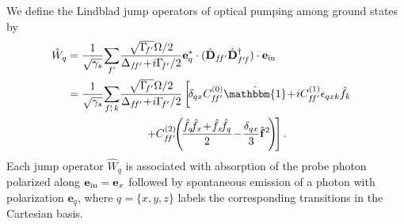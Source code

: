 \documentclass[aps,pra,twocolumn,superscriptaddress]{revtex4-1} %
\def\bra#1{\langle{#1}\rvert}%
\def\ket#1{\lvert{#1}\rangle}%
\def\Braket#1#2{\mathinner{\langle{#1}\! \mid\! {#2} \rangle}}
\newcommand{\nn}{\nonumber}
\begin{document}
\begin{appendix}
We define the Lindblad jump operators of optical pumping among ground states by~\cite{Deutsch2010a}
	\begin{align}\label{Eq::Wq_Faraday}
		\hat{W}_q &= \frac{1}{\sqrt{\gamma_s}}\!\sum_{f'}\!\frac{\sqrt{\Gamma\!_{f'}}\Omega/2}{\Delta_{f\!f'} \!+\! i\Gamma\!_{f'}/2}\mathbf{e}_q^*\cdot(\hat{\mathbf{D}}_{f\!f'}  \hat{\mathbf{D}}^\dagger_{f'\!f} )\cdot\mathbf{e}_{\rm in} \\
		&= \frac{1}{\sqrt{\gamma_s}}\!\sum_{f'\!\!,\,k}\! \frac{\sqrt{\Gamma\!_{f'}}\Omega/2}{\Delta_{f\!f'}\!+\!i\Gamma\!_{f'}/2} \left[\!\delta_{qx}C_{f\!f'}^{(0)}\hat{\mathbbm{1}} \!+\! iC_{f\!f'}^{(1)}\epsilon_{qxk}\hat{f}_k \phantom{\frac{1}{1}}\right.\nn\\
		&\quad\quad\quad\quad\quad\quad\quad\left.+ C_{f\!f'}^{(2)}\!\!\left(\!\frac{\hat{f}_q\!\hat{f}_{x}\!+\!\hat{f}_{x}\!\hat{f}_q }{2} \!-\! \frac{\delta_{qx}}{3}\hat{\mathbf{f}}^2\! \right)\! \right].
	\end{align}
Each jump operator $\hat{W}_q$ is associated with absorption of the probe photon polarized along $ \mathbf{e}_{\rm in}=\mathbf{e}_x $ followed by spontaneous emission of a photon with polarization $ \mathbf{e}_q $, where $q= \{x,y,z\}$ labels the corresponding transitions in the Cartesian basis.


\end{appendix}
\end{document}

